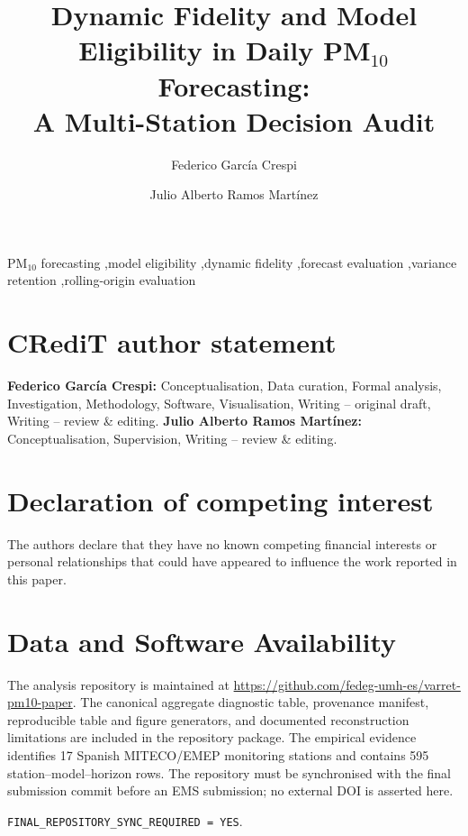 \documentclass[3p,times]{elsarticle}
\begin{document}
\begin{frontmatter}

\title{Dynamic Fidelity and Model Eligibility in Daily PM$_{10}$ Forecasting:\\A Multi-Station Decision Audit}

\author[1]{Federico Garc\'ia Crespi}

\author[2]{Julio Alberto Ramos Mart\'inez}




\begin{keyword}
PM$_{10}$ forecasting \sep model eligibility \sep dynamic fidelity \sep forecast evaluation \sep variance retention \sep rolling-origin evaluation
\end{keyword}

\end{frontmatter}




\clearpage



\section*{CRediT author statement}
\textbf{Federico Garc\'ia Crespi:} Conceptualisation, Data curation, Formal analysis, Investigation, Methodology, Software, Visualisation, Writing -- original draft, Writing -- review \& editing. \textbf{Julio Alberto Ramos Mart\'inez:} Conceptualisation, Supervision, Writing -- review \& editing.

\section*{Declaration of competing interest}
The authors declare that they have no known competing financial interests or personal relationships that could have appeared to influence the work reported in this paper.

\section*{Data and Software Availability}
The analysis repository is maintained at \url{https://github.com/fedeg-umh-es/varret-pm10-paper}. The canonical aggregate diagnostic table, provenance manifest, reproducible table and figure generators, and documented reconstruction limitations are included in the repository package. The empirical evidence identifies 17 Spanish MITECO/EMEP monitoring stations and contains 595 station--model--horizon rows. The repository must be synchronised with the final submission commit before an EMS submission; no external DOI is asserted here.\par
\texttt{FINAL\_REPOSITORY\_SYNC\_REQUIRED = YES}.
\end{document}

